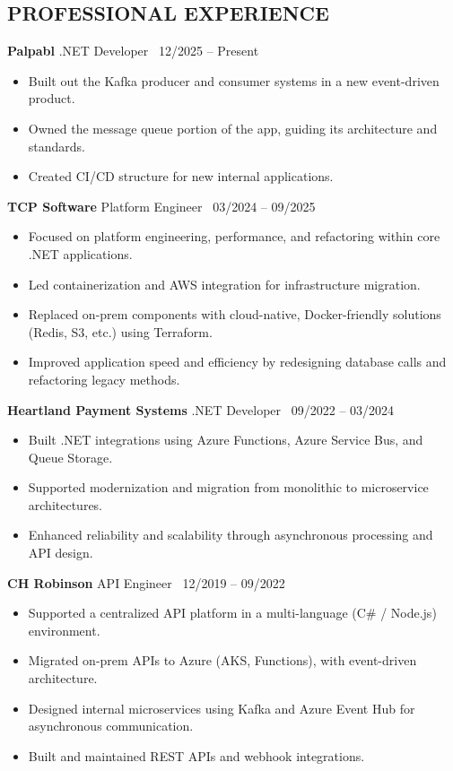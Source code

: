 \documentclass[11pt]{article}
\begin{document}
\subsection*{PROFESSIONAL EXPERIENCE}
\textbf{Palpabl} \hfill .NET Developer \textbar\ 12/2025 -- Present 
\begin{itemize}[label=--]
\item Built out the Kafka producer and consumer systems in a new event-driven product.
\item Owned the message queue portion of the app, guiding its architecture and standards.
\item Created CI/CD structure for new internal applications. \\
\end{itemize}
\textbf{TCP Software} \hfill Platform Engineer \textbar\ 03/2024 -- 09/2025
\begin{itemize}[label=--]
\item Focused on platform engineering, performance, and refactoring within core .NET applications. 
\item Led containerization and AWS integration for infrastructure migration.
\item Replaced on-prem components with cloud-native, Docker-friendly solutions (Redis, S3, etc.) using Terraform.
\item Improved application speed and efficiency by redesigning database calls and refactoring legacy methods. \\
\end{itemize}
\textbf{Heartland Payment Systems} \hfill .NET Developer \textbar\ 09/2022 -- 03/2024
\begin{itemize}[label=--]
\item Built .NET integrations using Azure Functions, Azure Service Bus, and Queue Storage.
\item Supported modernization and migration from monolithic to microservice architectures.
\item Enhanced reliability and scalability through asynchronous processing and API design. \\ 
\end{itemize}
\textbf{CH Robinson} \hfill API Engineer \textbar\ 12/2019 -- 09/2022
\begin{itemize}[label=--]
\item Supported a centralized API platform in a multi-language (C\# / Node.js) environment.
\item Migrated on-prem APIs to Azure (AKS, Functions), with event-driven architecture.
\item Designed internal microservices using Kafka and Azure Event Hub for asynchronous communication.
\item Built and maintained REST APIs and webhook integrations. \\ 
\end{itemize}
\end{document}
